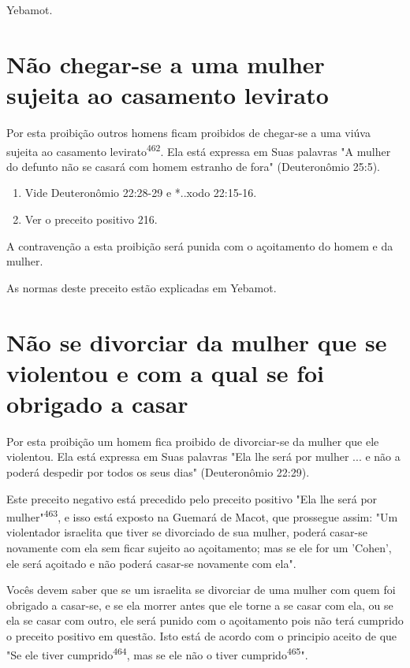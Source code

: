 \begin{itemize}
\begin{enumrate}
\begin{itemize}
\begin{itemize}
\begin{itemize}
Yebamot.

\section{Não chegar-se a uma mulher sujeita ao casamento levirato}

Por esta proibição outros homens ficam proibidos de chegar-se a uma
viúva sujeita ao casamento levirato\textsuperscript{462}. Ela está
expressa em Suas palavras "A mulher do defunto não se casará com homem
estranho de fora" (Deuteronô­mio 25:5).


\begin{enumerate}
\def\labelenumi{\arabic{enumi}.}
\setcounter{enumi}{460}
\item
 
 Vide Deuteronômio 22:28-29 e *..xodo 22:15-16.
 
\item
 
 Ver o preceito positivo 216.
 
\end{enumerate}



A contravenção a esta proibição será punida com o açoitamento do homem e
da mulher.

As normas deste preceito estão explicadas em Yebamot.

\section{Não se divorciar da mulher que se violentou e com a qual se foi
obrigado a casar}

Por esta proibição um homem fica proibido de divorciar-se da mu­lher que
ele violentou. Ela está expressa em Suas palavras "Ela lhe será por
mu­lher ... e não a poderá despedir por todos os seus dias"
(Deuteronômio 22:29).

Este preceito negativo está precedido pelo preceito positivo "Ela lhe
será por mulher"\textsuperscript{463}, e isso está exposto na Guemará de
Macot, que prossegue assim: "Um violentador israelita que tiver se
divorciado de sua mulher, poderá casar-se novamente com ela sem ficar
sujeito ao açoitamento; mas se ele for um 'Cohen', ele será açoitado e
não poderá casar-se novamente com ela".

Vocês devem saber que se um israelita se divorciar de uma mulher com
quem foi obrigado a casar-se, e se ela morrer antes que ele torne a se
casar com ela, ou se ela se casar com outro, ele será punido com o
açoitamento pois não terá cumprido o preceito positivo em questão. Isto
está de acordo com o principio aceito de que "Se ele tiver
cumprido\textsuperscript{464}, mas se ele não o tiver
cumprido\textsuperscript{465}".


\end{itemize}
\end{itemize}
\end{itemize}
\end{enumrate}
\end{itemize}
